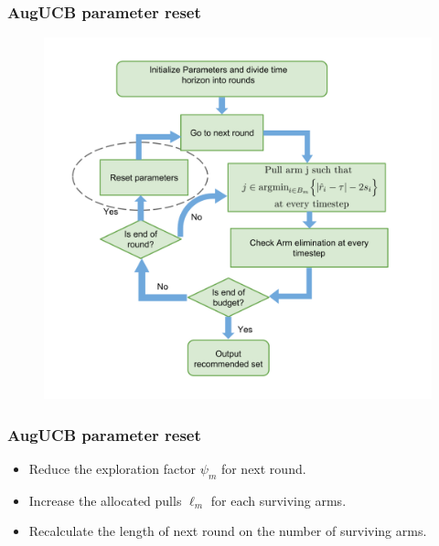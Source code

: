 \begin{frame}
\frametitle{AugUCB parameter reset}
\begin{figure}
\includegraphics[scale=0.24]{img/AugUCB_flow_reset.png}
\end{figure}
\end{frame}


\begin{frame}
\frametitle{AugUCB parameter reset}
\begin{itemize}
\item<1-> Reduce the exploration factor $\psi_m$ for next round.
\item<2-> Increase the allocated pulls $\ell_m$ for each surviving arms.
\item<3-> Recalculate the length of next round on the number of surviving arms.
\end{itemize}
\end{frame}

